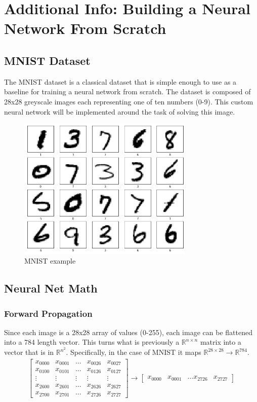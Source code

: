 \section{Additional Info: Building a Neural Network From Scratch}
\subsection{MNIST Dataset}
The MNIST dataset is a classical dataset that is simple enough to use as a baseline for training a neural network from scratch. The dataset is composed of 28x28 greyscale images each representing one of ten numbers (0-9). This custom neural network will be implemented around the task of solving this image.
\begin{figure}[htbp]
  \centerline{\includegraphics[width=0.75\textwidth]{images/mnist_example.png}}
  \caption{MNIST example}
  \label{fig:mnist_example}
\end{figure}

\subsection{Neural Net Math}
\subsubsection{Forward Propagation}
Since each image is a 28x28 array of values (0-255), each image can be flattened into a 784 length vector. This turns what is previously a $\mathbb{R}^{n\times n}$ matrix into a vector that is in $\mathbb{R}^{n^2}$. Specifically, in the case of MNIST it maps $\mathbb{R}^{28 \times 28} \to \mathbb{R}^{784}$.
\begin{align}
  \begin{bmatrix}
     x_{00 00} & x_{00 01} & \dots & x_{00 26}&  x_{00 27} \\
     x_{01 00} & x_{01 01} & \dots & x_{01 26}&  x_{01 27} \\
     \vdots & \vdots & \vdots & \vdots & \vdots \\
     x_{26 00} & x_{26 01} & \dots & x_{26 26}&  x_{26 27} \\
     x_{27 00} & x_{27 01} & \dots & x_{27 26}&  x_{27 27}
  \end{bmatrix}
  \to
  \begin{bmatrix}
    x_{00 00} & x_{00 01} & \dots x_{27 26}&  x_{27 27} 
 \end{bmatrix}
\end{align}

